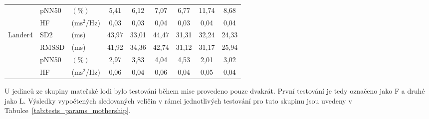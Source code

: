 \begin{table}[h]
\begin{threeparttable}
\begin{tabular*}{\linewidth}{@{\extracolsep{\fill}} lllcccccc @{}}
            & pNN50                                 & $(\%)$                         & 5,41                           & 6,12                            & 7,07            & 6,77        & 11,74           & 8,68        \\
            & HF                                    & ($\text{ms}^2$/Hz)             & 0,03                           & 0,03                           & 0,04            & 0,03        & 0,04            & 0,04        \\ \midrule
            \multirow[t]{4}{*}{Lander4} & SD2                                  & (ms)                           & 43,97                          & 33,01                          & 44,47           & 31,31        & 32,24           & 24,33       \\
            & RMSSD                                 & (ms)                           & 41,92                          & 34,36                          & 42,74           & 31,12        & 31,17           & 25,94       \\
            & pNN50                                 & $(\%)$                         & 2,97                           & 3,83                           & 4,04            & 4,53         & 2,01            & 3,02        \\
            & HF                                    & ($\text{ms}^2$/Hz)             & 0,06                           & 0,04                           & 0,06            & 0,04        & 0,05            & 0,04        \\
            \bottomrule
        \end{tabular*}
    \end{threeparttable}
    \label{tab:tests_params_lander}
\end{table}

U jedinců ze skupiny mateřské lodi bylo testování během mise provedeno pouze
dvakrát. První testování je tedy označeno jako F a druhé jako L. Výsledky
vypočtených sledovaných veličin v rámci jednotlivých testování pro tuto skupinu
jsou uvedeny v Tabulce~\ref{tab:tests_params_mothership}.

